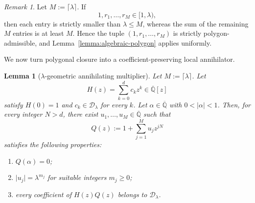 \documentclass[10pt]{amsart}
\newtheorem{lemma}[theorem]{Lemma}
\theoremstyle{definition}
\theoremstyle{remark}
\newtheorem{remark}[theorem]{Remark}
\numberwithin{equation}{section}
\newcommand{\Qbar}{\overline{\mathbb Q}}
\newcommand{\D}{\mathcal D}
\newcommand{\abs}[1]{\lvert #1\rvert}
\begin{document}
\begin{remark}\label{remark:number-of-sides}
Let $M:=\lceil\lambda\rceil$. If
\[
        1,r_1,\ldots,r_M\in[1,\lambda),
\]
then each entry is strictly smaller than $\lambda\leq M$, whereas the sum
of the remaining $M$ entries is at least $M$. Hence the tuple
$(1,r_1,\ldots,r_M)$ is strictly polygon-admissible, and
Lemma~\ref{lemma:algebraic-polygon} applies uniformly.
\end{remark}

We now turn polygonal closure into a coefficient-preserving local
annihilator.

\begin{lemma}[$\lambda$-geometric annihilating multiplier]\label{lemma:factor}
Let $M:=\lceil\lambda\rceil$. Let
\[
        H(z)=\sum_{k=0}^{d}c_kz^k\in\Qbar[z]
\]
satisfy $H(0)=1$ and $c_k\in\D_\lambda$ for every $k$. Let
$\alpha\in\Qbar$ with $0<\abs\alpha<1$. Then, for every integer $N>d$,
there exist $u_1,\ldots,u_M\in\Qbar$ such that
\begin{equation}\label{eq:factor-form}
        Q(z):=1+\sum_{j=1}^{M}u_jz^{jN}
\end{equation}
satisfies the following properties:
\begin{enumerate}[label=\textup{(\alph*)}]
\item $Q(\alpha)=0$;
\item $\abs{u_j}=\lambda^{m_j}$ for suitable integers $m_j\geq0$;
\item every coefficient of $H(z)Q(z)$ belongs to $\D_\lambda$.
\end{enumerate}
\end{lemma}
\end{document}
